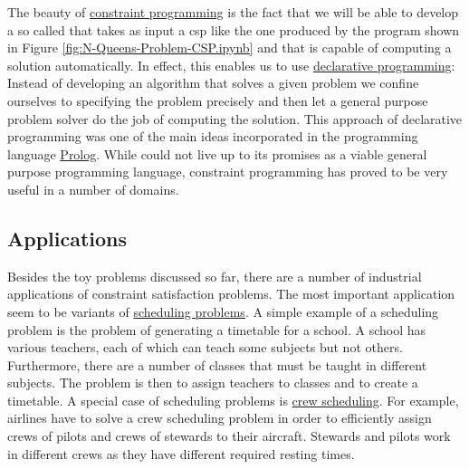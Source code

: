 The beauty of \href{https://en.wikipedia.org/wiki/Constraint_programming}{constraint programming} is the fact
that we will be able to develop a so called  that takes as input a \ac{csp}
like the one produced by the program shown in Figure \ref{fig:N-Queens-Problem-CSP.ipynb} and that is capable of
computing a solution automatically.  In effect, this enables us to use
\href{https://en.wikipedia.org/wiki/Declarative_programming}{declarative programming}:  Instead of developing
an algorithm that solves a given problem we confine ourselves to  specifying the problem precisely and then let a
general purpose problem solver do the job of computing the solution.  This approach of declarative programming 
was one of the main ideas incorporated in the programming language
\href{https://en.wikipedia.org/wiki/Prolog}{Prolog}.  While  could not live up to its promises
as a viable general purpose programming language, constraint programming has proved to be very useful in a
number of domains.  

\subsection{Applications}
Besides the toy problems discussed so far, there are a number of industrial applications of constraint
satisfaction problems.  The most important application seem to be variants of
\href{https://en.wikipedia.org/wiki/Scheduling_(production_processes)}{scheduling problems}. 
A simple example of a scheduling problem is the problem of generating a timetable for a school.  A school has
various teachers, each of which can teach some subjects but not others.  Furthermore, there are a number of
classes that must be taught in different subjects.  The problem is then to assign teachers to classes and to
create a timetable.  A special case of scheduling problems is
\href{https://en.wikipedia.org/wiki/Crew_scheduling}{crew scheduling}.  For example, airlines have to solve a
crew scheduling problem in order to efficiently assign crews of pilots and crews of stewards to their
aircraft.  Stewards and pilots work in different crews as they have different required resting times.

